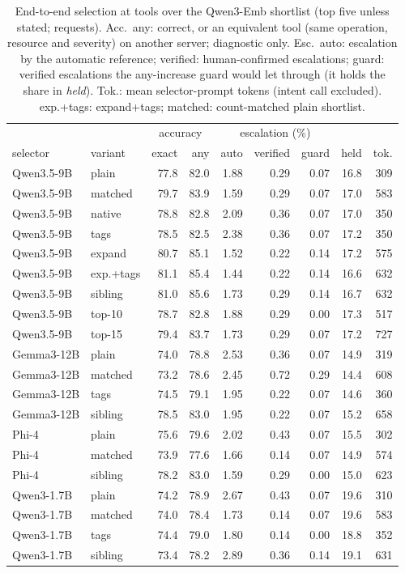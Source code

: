 \begin{table}[t]\centering\caption{End-to-end selection at \NumPoolTools{} tools over the Qwen3-Emb shortlist (top five unless stated; \NumQueries{} requests). Acc.\ any: correct, or an equivalent tool (same operation, resource and severity) on another server; diagnostic only. Esc.\ auto: escalation by the automatic reference; verified: human-confirmed escalations; guard: verified escalations the any-increase guard would let through (it holds the share in \emph{held}). Tok.: mean selector-prompt tokens (intent call excluded). exp.+tags: expand+tags; matched: count-matched plain shortlist.}\label{tab:main}
\setlength{\tabcolsep}{1.6pt}\footnotesize
\begin{tabular}{llrrrrrrr}\toprule
 & & \multicolumn{2}{c}{accuracy} & \multicolumn{3}{c}{escalation (\%)} & & \\
selector & variant & exact & any & auto & verified & guard & held & tok.\\\midrule
Qwen3.5-9B & plain & 77.8 & 82.0 & 1.88 & 0.29 & 0.07 & 16.8 & 309 \\
Qwen3.5-9B & matched & 79.7 & 83.9 & 1.59 & 0.29 & 0.07 & 17.0 & 583 \\
Qwen3.5-9B & native & 78.8 & 82.8 & 2.09 & 0.36 & 0.07 & 17.0 & 350 \\
Qwen3.5-9B & tags & 78.5 & 82.5 & 2.38 & 0.36 & 0.07 & 17.2 & 350 \\
Qwen3.5-9B & expand & 80.7 & 85.1 & 1.52 & 0.22 & 0.14 & 17.2 & 575 \\
Qwen3.5-9B & exp.+tags & 81.1 & 85.4 & 1.44 & 0.22 & 0.14 & 16.6 & 632 \\
Qwen3.5-9B & sibling & 81.0 & 85.6 & 1.73 & 0.29 & 0.14 & 16.7 & 632 \\
Qwen3.5-9B & top-10 & 78.7 & 82.8 & 1.88 & 0.29 & 0.00 & 17.3 & 517 \\
Qwen3.5-9B & top-15 & 79.4 & 83.7 & 1.73 & 0.29 & 0.07 & 17.2 & 727 \\
\midrule
Gemma3-12B & plain & 74.0 & 78.8 & 2.53 & 0.36 & 0.07 & 14.9 & 319 \\
Gemma3-12B & matched & 73.2 & 78.6 & 2.45 & 0.72 & 0.29 & 14.4 & 608 \\
Gemma3-12B & tags & 74.5 & 79.1 & 1.95 & 0.22 & 0.07 & 14.6 & 360 \\
Gemma3-12B & sibling & 78.5 & 83.0 & 1.95 & 0.22 & 0.07 & 15.2 & 658 \\
\midrule
Phi-4 & plain & 75.6 & 79.6 & 2.02 & 0.43 & 0.07 & 15.5 & 302 \\
Phi-4 & matched & 73.9 & 77.6 & 1.66 & 0.14 & 0.07 & 14.9 & 574 \\
Phi-4 & sibling & 78.2 & 83.0 & 1.59 & 0.29 & 0.00 & 15.0 & 623 \\
\midrule
Qwen3-1.7B & plain & 74.2 & 78.9 & 2.67 & 0.43 & 0.07 & 19.6 & 310 \\
Qwen3-1.7B & matched & 74.0 & 78.4 & 1.73 & 0.14 & 0.07 & 19.6 & 583 \\
Qwen3-1.7B & tags & 74.4 & 79.0 & 1.80 & 0.14 & 0.00 & 18.8 & 352 \\
Qwen3-1.7B & sibling & 73.4 & 78.2 & 2.89 & 0.36 & 0.14 & 19.1 & 631 \\
\bottomrule\end{tabular}\end{table}
